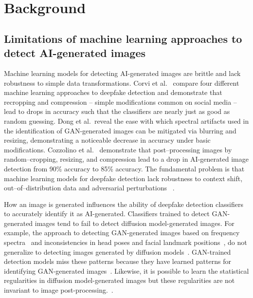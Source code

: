 \section{Background}\label{sec:relwork}

\subsection{Limitations of machine learning approaches to detect AI-generated images}

Machine learning models for detecting AI-generated images are brittle and lack robustness to simple data transformations. Corvi et al.~\cite{corvi2023intriguingpropertiessyntheticimages} compare four different machine learning approaches to deepfake detection and demonstrate that recropping and compression – simple modifications common on social media – lead to drops in accuracy such that the classifiers are nearly just as good as random guessing. Dong et al.~\cite{9879575}reveal the ease with which spectral artifacts used in the identification of GAN-generated images can be mitigated via blurring and resizing, demonstrating a noticeable decrease in accuracy under basic modifications. Cozzolino et al.~\cite{cozzolino2024raisingbaraigeneratedimage} demonstrate that post--processing images by random--cropping, resizing, and compression lead to a drop in AI-generated image detection from 90\% accuracy to 85\% accuracy. The fundamental problem is that machine learning models for deepfake detection lack robustness to context shift, out--of--distribution data and adversarial perturbations ~\cite{wang2023deepfakedetectioncomprehensivestudy, ha2024, groh2022identifying, hulzebosch2020detectingcnngeneratedfacialimages}. 

How an image is generated influences the ability of deepfake detection classifiers to accurately identify it as AI-generated. Classifiers trained to detect GAN-generated images tend to fail to detect diffusion model-generated images. For example, the approach to detecting GAN-generated images based on frequency spectra~\cite{marra2018gansleaveartificialfingerprints, yu2019attributingfakeimagesgans, 9035107, durall2020watchupconvolutioncnnbased, bi2023detectinggeneratedimagesreal, pmlr-v119-frank20a} and inconsistencies in head poses and facial landmark positions~\cite{yang2018exposingdeepfakesusing, yang2019exposinggansynthesizedfacesusing, Mundra_2023_CVPR}, do not generalize to detecting images generated by diffusion models~\cite{ojha2024universalfakeimagedetectors}. GAN-trained detection models miss these patterns because they have learned patterns for identifying GAN-generated images~\cite{wang2020cnn, ricker2024detectiondiffusionmodeldeepfakes}. Likewise, it is possible to learn the statistical regularities in diffusion model-generated images but these regularities are not invariant to image post-processing.~\cite{xi2023aigeneratedimagedetectionusing, 10334046, wang2023dirediffusiongeneratedimagedetection, ma2023exposingfakeeffectivediffusiongenerated, yang2023diffusion}. 

